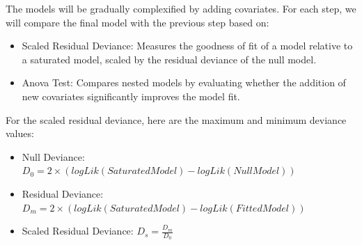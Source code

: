 \documentclass[
  english,
  11pt,
]{article}
\newenvironment{Shaded}{\begin{snugshade}}{\end{snugshade}}
\newcommand{\AttributeTok}[1]{\textcolor[rgb]{0.13,0.29,0.53}{#1}}
\newcommand{\DecValTok}[1]{\textcolor[rgb]{0.00,0.00,0.81}{#1}}
\newcommand{\FunctionTok}[1]{\textcolor[rgb]{0.13,0.29,0.53}{\textbf{#1}}}
\newcommand{\NormalTok}[1]{#1}
\newcommand{\OtherTok}[1]{\textcolor[rgb]{0.56,0.35,0.01}{#1}}
\newcommand{\SpecialCharTok}[1]{\textcolor[rgb]{0.81,0.36,0.00}{\textbf{#1}}}
\newcommand{\StringTok}[1]{\textcolor[rgb]{0.31,0.60,0.02}{#1}}
\providecommand{\tightlist}{%
  \setlength{\itemsep}{0pt}\setlength{\parskip}{0pt}}
\begin{document}
The models will be gradually complexified by adding covariates. For each
step, we will compare the final model with the previous step based on:

\begin{itemize}
\tightlist
\item
  Scaled Residual Deviance: Measures the goodness of fit of a model
  relative to a saturated model, scaled by the residual deviance of the
  null model.
\item
  Anova Test: Compares nested models by evaluating whether the addition
  of new covariates significantly improves the model fit.
\end{itemize}

For the scaled residual deviance, here are the maximum and minimum
deviance values:

\begin{itemize}
\tightlist
\item
  Null Deviance:
  \(D_0 = 2 \times \left( logLik(SaturatedModel) - logLik(NullModel) \right)\)
\item
  Residual Deviance:
  \(D_m = 2 \times \left( logLik(SaturatedModel) - logLik(FittedModel) \right)\)
\item
  Scaled Residual Deviance: \(D_s = \frac{D_m}{D_0}\)
\end{itemize}

\begin{Shaded}
\end{Shaded}
\end{document}
